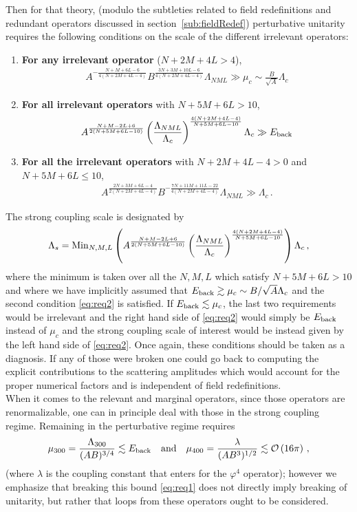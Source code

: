 \documentclass[12pt]{article}
\def\ba{\begin{eqnarray}}
\def\ea{\end{eqnarray}}
\def\({\left(}
\def\){\right)}
\begin{document}
Then for that theory,  (modulo the subtleties related to field redefinitions and redundant operators discussed in section~\ref{sub:fieldRedef}) perturbative unitarity requires the following conditions on the scale of the different irrelevant operators:
\begin{enumerate}
\item {\bf For any  irrelevant operator} ($N+2M+4L>4$),
\ba
\label{eq:req2}
A^{- \frac{N+M+6L-6}{4(N+2M+4L-4)}}B^{\frac{3N+3M+10L-6}{4(N+2M+4L-4)}} \Lambda_{NML} \gg   \mu_c \sim \frac{B}{\sqrt{A}} \Lambda_c
\ea
\item {\bf For all irrelevant operators} with $N+5M+6L>10$,
\ba
\label{eq:req3}
 A^{\frac{N+M-2L+6}{2(N+5M+6L-10)}}\(\frac{\Lambda_{NML}}{\Lambda_c}\)^{\frac{4(N+2M+4L-4)}{N+5M+6L-10}} \Lambda_c \gg E_{\rm back}
 \ea
 \item {\bf For all the irrelevant operators} with $N+2M+4L-4>0$ and $N+5M+6L\le 10$,
\ba
\label{eq:req4}
A^{\frac{2N+3M+6L-4}{2(N+2M+4L-4)}} B^{-\frac{7N+11M+11L-22}{4(N+2M+4L-4)}} \Lambda_{NML} \gg   \Lambda_c \,.
\ea
\end{enumerate}
The strong coupling scale is designated by
\ba
\label{eq:Lambdas}
\Lambda_s={\rm Min}_{N,M,L}\(A^{\frac{N+M-2L+6}{2(N+5M+6L-10)}}\(\frac{\Lambda_{NML}}{\Lambda_c}\)^{\frac{4(N+2M+4L-4)}{N+5M+6L-10}}\) \Lambda_c\,,
\ea
where the minimum is taken over all the $N,M,L$ which satisfy $N+5M+6L>10$ and
where we have implicitly assumed  that $E_{\rm back}\gtrsim \mu_c\sim B/\sqrt{A} \Lambda_c$ and the second condition \eqref{eq:req2} is satisfied. If $E_{\rm back}\lesssim \mu_c$, the last two requirements would be irrelevant and the right hand side of \eqref{eq:req2} would simply be $E_{\rm back}$ instead of $\mu_c$ and the strong coupling scale of interest would be instead given by the left hand side of \eqref{eq:req2}. Once again, these conditions should be taken as a diagnosis. If any of those were broken one could go back to computing the explicit contributions to the scattering amplitudes which would account for the proper numerical factors and is independent of field redefinitions.  \\

When it comes to the relevant and marginal operators, since those operators are renormalizable, one can in principle  deal with those in the strong coupling regime. Remaining in the perturbative regime requires
\ba
\label{eq:req1}
\mu_{300}=  \frac{\Lambda_{300}}{(AB)^{3/4}} \lesssim  E_{\rm back}\quad {\rm and } \quad \mu_{400}= \frac{\lambda}{(A B^3)^{1/2}} \lesssim \mathcal{O}\(16 \pi\)\,,
\ea
(where $\lambda$ is the coupling constant that enters for the $\varphi^4$ operator); however we emphasize that breaking this bound \eqref{eq:req1} does not directly imply breaking of unitarity, but rather that loops from these operators ought to be considered. \\
\end{document}
